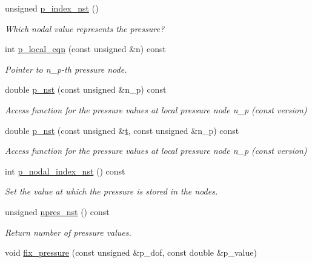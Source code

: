 \begin{DoxyCompactItemize}
unsigned \hyperlink{classoomph_1_1TTaylorHoodElement_a051ebd14ec8a7327e6dd76986eb007a0}{p\+\_\+index\+\_\+nst} ()
\begin{DoxyCompactList}\small\item\em Which nodal value represents the pressure? \end{DoxyCompactList}\item 
int \hyperlink{classoomph_1_1TTaylorHoodElement_adb29767b15234d632c11991a4f9a3911}{p\+\_\+local\+\_\+eqn} (const unsigned \&n) const
\begin{DoxyCompactList}\small\item\em Pointer to n\+\_\+p-\/th pressure node. \end{DoxyCompactList}\item 
double \hyperlink{classoomph_1_1TTaylorHoodElement_aabf332af5cb1c937251466fbb1cb7274}{p\+\_\+nst} (const unsigned \&n\+\_\+p) const
\begin{DoxyCompactList}\small\item\em Access function for the pressure values at local pressure node n\+\_\+p (const version) \end{DoxyCompactList}\item 
double \hyperlink{classoomph_1_1TTaylorHoodElement_aa04b4b4ec9d1e04f4d6b6bb00c8fa629}{p\+\_\+nst} (const unsigned \&\hyperlink{cfortran_8h_af6f0bd3dc13317f895c91323c25c2b8f}{t}, const unsigned \&n\+\_\+p) const
\begin{DoxyCompactList}\small\item\em Access function for the pressure values at local pressure node n\+\_\+p (const version) \end{DoxyCompactList}\item 
int \hyperlink{classoomph_1_1TTaylorHoodElement_abbf584f29e53f15d5b0b263882138eac}{p\+\_\+nodal\+\_\+index\+\_\+nst} () const
\begin{DoxyCompactList}\small\item\em Set the value at which the pressure is stored in the nodes. \end{DoxyCompactList}\item 
unsigned \hyperlink{classoomph_1_1TTaylorHoodElement_ae8b8462176202ddc647cd59c731d9eb9}{npres\+\_\+nst} () const
\begin{DoxyCompactList}\small\item\em Return number of pressure values. \end{DoxyCompactList}\item 
void \hyperlink{classoomph_1_1TTaylorHoodElement_af20b4527dcb0206523f22d0dd4825727}{fix\+\_\+pressure} (const unsigned \&p\+\_\+dof, const double \&p\+\_\+value)

\end{DoxyCompactItemize}
